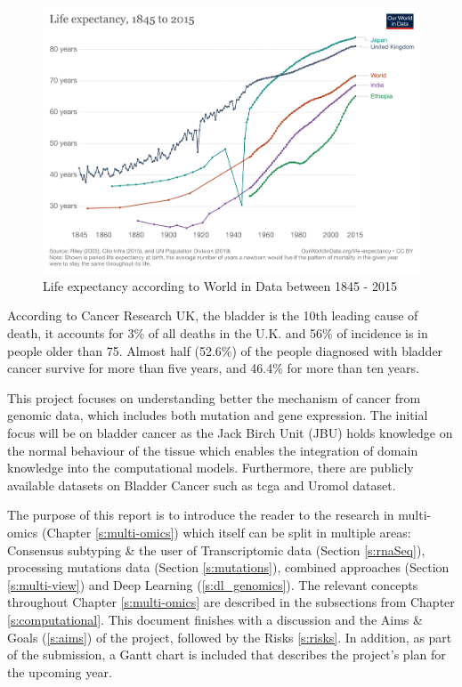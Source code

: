 \begin{figure}[!htb]
    \centering\includegraphics[width=1.0\textwidth,height=0.3\textheight,keepaspectratio]{Images/Resources/life-expectancy.png}
      \caption{Life expectancy according to World in Data between 1845 - 2015\cite{World_in_Data_undated-no}}
      \label{fig:life_expectancy}
  \end{figure}
  \FloatBarrier

According to Cancer Research UK\cite{Cancer_Research_UK2015-cf}, the bladder is the 10th leading cause of death, it accounts for 3\% of all deaths in the U.K. and 56\% of incidence is in people older than 75. Almost half (52.6\%) of the people diagnosed with bladder cancer survive for more than five years, and 46.4\% for more than ten years. 

This project focuses on understanding better the mechanism of cancer from genomic data, which includes both mutation and gene expression. The initial focus will be on bladder cancer as the Jack Birch Unit (JBU) holds knowledge on the normal behaviour of the tissue which enables the integration of domain knowledge into the computational models. Furthermore, there are publicly available datasets on Bladder Cancer such as \acrfull{tcga}\cite{Tcga2018-sj} and Uromol dataset\cite{Lindskrog2021-ov, The_European_Genome-phenome_Archive_undated-pz}.

The purpose of this report is to introduce the reader to the research in multi-omics (Chapter \ref{s:multi-omics}) which itself can be split in multiple areas: Consensus subtyping \& the user of Transcriptomic data (Section \ref{s:rnaSeq}), processing mutations data (Section \ref{s:mutations}), combined approaches (Section \ref{s:multi-view}) and Deep Learning (\ref{s:dl_genomics}). The relevant concepts throughout  Chapter \ref{s:multi-omics} are described in the subsections from Chapter \ref{s:computational}. This document finishes with a discussion and the Aims \& Goals (\ref{s:aims}) of the project, followed by the Risks \ref{s:risks}. In addition, as part of the submission, a Gantt chart is included that describes the project's plan for the upcoming year. 


